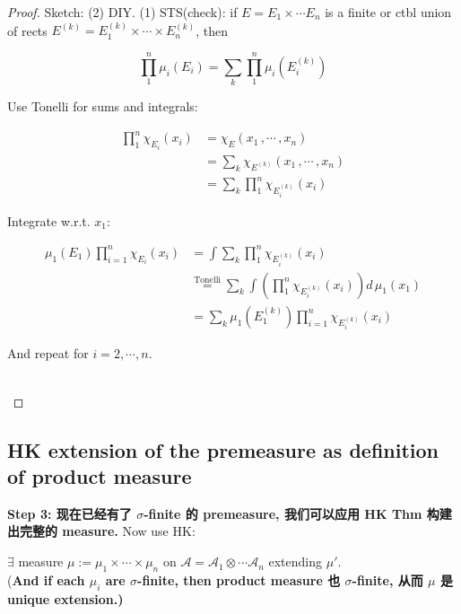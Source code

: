 \begin{proof}

Sketch: (2) DIY. (1) STS(check): if \(E = E_{1} \times \cdots E_{n}\) is a finite or ctbl union of rects \(E^{(k)} = E_{1}^{(k)} \times \cdots \times E_{n}^{(k)}\), then

\[\prod\limits_{1}^{n}\mu_{i}(E_{i}) = \sum\limits_{k}\prod\limits_{1}^{n}\mu_{i}(E_{i}^{(k)})\]

Use Tonelli for sums and integrals:

\[\begin{matrix}
{\prod\limits_{1}^{n}\chi_{E_{i}}(x_{i})} & {= \chi_{E}(x_{1}\,,\cdots\,,x_{n})} \\
 & {= \sum\limits_{k}\chi_{E^{(k)}}(x_{1}\,,\cdots\,,x_{n})} \\
 & {= \sum\limits_{k}\prod\limits_{1}^{n}\chi_{E_{i}^{(k)}}(x_{i})}
\end{matrix}\]

Integrate w.r.t. \(x_{1}\):

\[\begin{matrix}
{\mu_{1}(E_{1})\prod\limits_{i = 1}^{n}\chi_{E_{i}}(x_{i})} & {= \int\sum\limits_{k}\prod\limits_{1}^{n}\chi_{E_{i}^{(k)}}(x_{i})} \\
 & {\overset{\text{Tonelli}}{=}\sum\limits_{k}\int(\prod\limits_{1}^{n}\chi_{E_{i}^{(k)}}(x_{i}))d\,\mu_{1}(x_{1})} \\
 & {= \sum\limits_{k}\mu_{1}(E_{1}^{(k)})\prod\limits_{i = 1}^{n}\chi_{E_{i}^{(k)}}(x_{i})}
\end{matrix}\]

And repeat for \(i = 2,\cdots,n\).\\
\strut \\

\end{proof}

\subsection{HK extension of the premeasure as definition of product measure}\label{hk-extension-of-the-premeasure-as-definition-of-product-measure}

\textbf{Step 3: 现在已经有了 \(\sigma\)-finite 的 premeasure, 我们可以应用 HK Thm 构建出完整的 measure.} Now use HK:

\begin{corollary}

\(\exists\) measure \(\mu := \mu_{1} \times \cdots \times \mu_{n}\) on \(\mathcal{A} = \mathcal{A}_{1} \otimes \cdots\mathcal{A}_{n}\) extending \(\mu'\).\\
(\textbf{And if each \(\mu_{i}\) are \(\sigma\)-finite, then product measure 也 \(\sigma\)-finite, 从而 \(\mu\) 是 unique extension.)}

\end{corollary}


